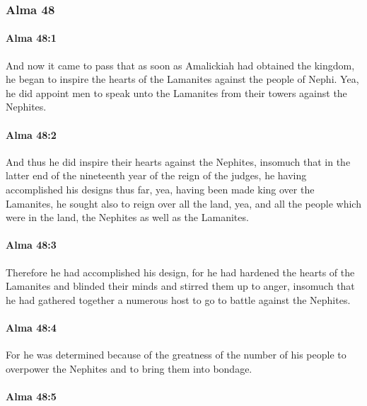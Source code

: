 	\subsubsection{Alma 48} %
		\label{ALMA-48}
		
		\paragraph{Alma 48:1} %
			\label{ALMA-48-1}

			And now it came to pass that
			as soon as Amalickiah had obtained the kingdom,
			he began to inspire the hearts of the Lamanites against the people of Nephi.
			Yea, he did appoint men to speak
			unto the Lamanites from their towers
			against the Nephites.

		\paragraph{Alma 48:2} %
			\label{ALMA-48-2}

			And thus he did inspire their hearts against the Nephites,
			insomuch that in the latter end of the nineteenth year of the reign of the judges,
			he having accomplished his designs thus far,
			yea, having been made king over the Lamanites,
			he sought also to reign over all the land,
			yea, and all the people which were in the land,
			the Nephites as well as the Lamanites.

		\paragraph{Alma 48:3} %
			\label{ALMA-48-3}

			Therefore he had accomplished his design,
			for he had hardened the hearts of the Lamanites and blinded their minds
			and stirred them up to anger,
			insomuch that he had gathered together a numerous host
			to go to battle against the Nephites.

		\paragraph{Alma 48:4} %
			\label{ALMA-48-4}

			For he was determined because of the greatness of the number of his people
			to overpower the Nephites and to bring them into bondage.

		\paragraph{Alma 48:5} %
			\label{ALMA-48-5}

